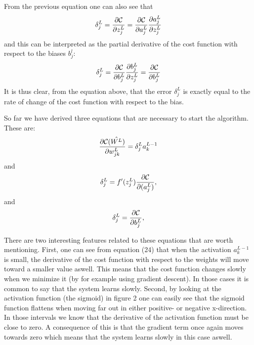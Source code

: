 \documentclass[a4paper,12pt]{article}
\begin{document}
From the previous equation one can also see that
\begin{equation}
    \delta_j^L =\frac{\partial {\cal C}}{\partial z_j^L}= \frac{\partial {\cal C}}{\partial a_j^L}\frac{\partial a_j^L}{\partial z_j^L}
\end{equation}
and this can be interpreted as the partial derivative of the cost function with respect to the biases $b_j^l$:
\begin{equation}
    \delta_j^L = \frac{\partial {\cal C}}{\partial b_j^L}\frac{\partial b_j^L}{\partial z_j^L}=\frac{\partial {\cal C}}{\partial b_j^L}
\end{equation}
It is thus clear, from the equation above, that the error $\delta_j^L$ is exactly equal to the rate of change of the cost function with respect to the bias.\newline

So far we have derived three equations that are necessary to start the algorithm. These are:
\begin{equation}
    \frac{\partial{\cal C}(\hat{W^L})}{\partial w_{jk}^L}  =  \delta_j^La_k^{L-1}
\end{equation}
and
\begin{equation}
\delta_j^L = f'(z_j^L)\frac{\partial {\cal C}}{\partial (a_j^L)},
\end{equation}
and
\begin{equation}
\delta_j^L = \frac{\partial {\cal C}}{\partial b_j^L},
\end{equation}

There are two interesting features related to these equations that are worth mentioning. First, one can see from equation (24) that when the activation $a_k^{L-1}$ is small, the derivative of the cost function with respect to the weights will move toward a smaller value aswell. This means that the cost function changes slowly when we minimize it (by for example using gradient descent). In those cases it is common to say that the system learns slowly.\newline
Second, by looking at the activation function (the sigmoid) in figure 2 one can easily see that the sigmoid function flattens when moving far out in either positive- or negative x-direction. In those intervals we know that the derivative of the activation function must be close to zero. A consequence of this is that the gradient term once again moves towards zero which means that the system learns slowly in this case aswell.\newline
\end{document}
